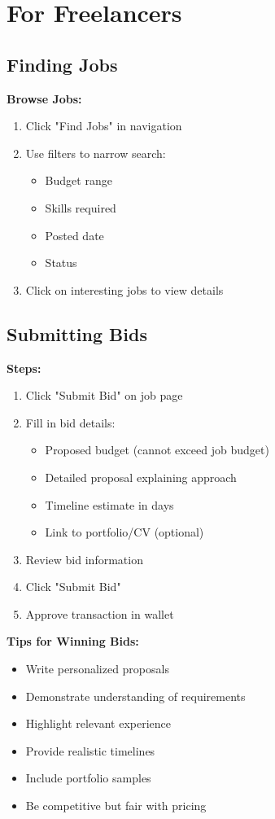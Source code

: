\documentclass[a4paper,13pt,twoside]{report}
\theoremstyle{definition}
\begin{document}
\section{For Freelancers}

\subsection{Finding Jobs}

\textbf{Browse Jobs:}
\begin{enumerate}
    \item Click "Find Jobs" in navigation
    \item Use filters to narrow search:
    \begin{itemize}
        \item Budget range
        \item Skills required
        \item Posted date
        \item Status
    \end{itemize}
    \item Click on interesting jobs to view details
\end{enumerate}

\subsection{Submitting Bids}

\textbf{Steps:}
\begin{enumerate}
    \item Click "Submit Bid" on job page
    \item Fill in bid details:
    \begin{itemize}
        \item Proposed budget (cannot exceed job budget)
        \item Detailed proposal explaining approach
        \item Timeline estimate in days
        \item Link to portfolio/CV (optional)
    \end{itemize}
    \item Review bid information
    \item Click "Submit Bid"
    \item Approve transaction in wallet
\end{enumerate}

\textbf{Tips for Winning Bids:}
\begin{itemize}
    \item Write personalized proposals
    \item Demonstrate understanding of requirements
    \item Highlight relevant experience
    \item Provide realistic timelines
    \item Include portfolio samples
    \item Be competitive but fair with pricing
\end{itemize}
\end{document}
